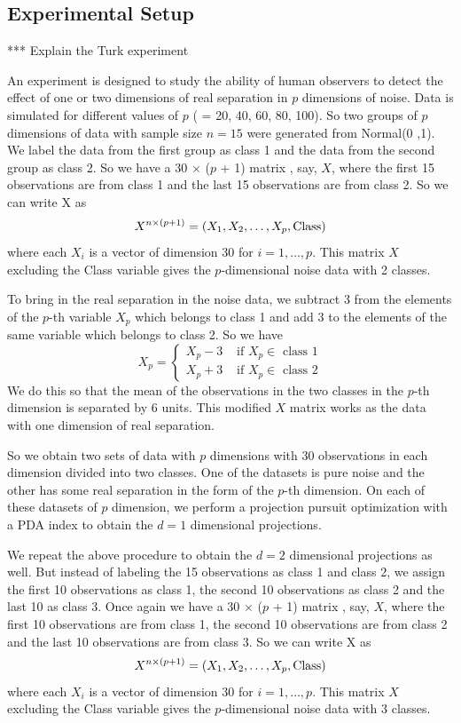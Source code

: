 \documentclass[12]{article}
\newcommand{\blue}{\color{blue}}
\begin{document}
\subsection{Experimental Setup}

{\blue*** Explain the Turk experiment}

An experiment is designed to study the ability of human observers to detect the effect of one or two dimensions of real separation in $p$ dimensions of noise. Data is simulated for different values of $p$  ( = 20, 40, 60, 80, 100).  So two groups of $p$ dimensions of data with sample size $n = 15$ were generated from Normal(0 ,1). We label the data from the first group as class 1 and the data from the second group as class 2. So we have a 30 $\times$ ($p$ + 1) matrix , say, $X$,  where the first 15 observations are from class 1 and the last 15 observations are from class 2.  So we can write X as
$$X^{n \times (p + 1)} = (X_1, X_2, \dots, X_p, \hbox{Class})$$ where each $X_i$ is a vector of dimension 30 for $i = 1, \dots, p$. This matrix $X$ excluding the Class variable gives the $p$-dimensional noise data with 2 classes.

To bring in the real separation in the noise data, we subtract 3 from the elements of the $p$-th variable $X_p$ which belongs to class 1 and add 3 to the elements of the same variable which belongs to class 2. So we have
$$
X_p = \left\{ \begin{array}{rl}
 X_p - 3 &\mbox{ if $X_p \in$ class 1} \\
 X_p + 3 &\mbox{ if $X_p \in$ class 2}
       \end{array} \right.
$$
We do this so that the mean of the observations in the two classes in the $p$-th dimension is separated by 6 units. This modified $X$ matrix works as the data with one dimension of real separation. 

So we obtain two sets of data with $p$ dimensions with 30 observations in each dimension divided into two classes. One of the datasets is pure noise and the other has some real separation in the form of the $p$-th dimension. On each of these datasets of $p$ dimension, we perform a projection pursuit optimization with a PDA index to obtain the $d = 1$ dimensional projections.  

We repeat the above procedure to obtain the $d = 2$ dimensional projections as well. But instead of labeling the 15 observations as class 1 and class 2, we assign the first 10 observations as class 1, the second 10 observations as class 2 and the last 10 as class 3. Once again we have a 30 $\times$ ($p$ + 1) matrix , say, $X$,  where the first 10 observations are from class 1, the second 10 observations are from class 2 and the last 10 observations are from class 3.  So we can write X as
$$X^{n \times (p + 1)} = (X_1, X_2, \dots, X_p, \hbox{Class})$$ where each $X_i$ is a vector of dimension 30 for $i = 1, \dots, p$. This matrix $X$ excluding the Class variable gives the $p$-dimensional noise data with 3 classes.
\end{document}
